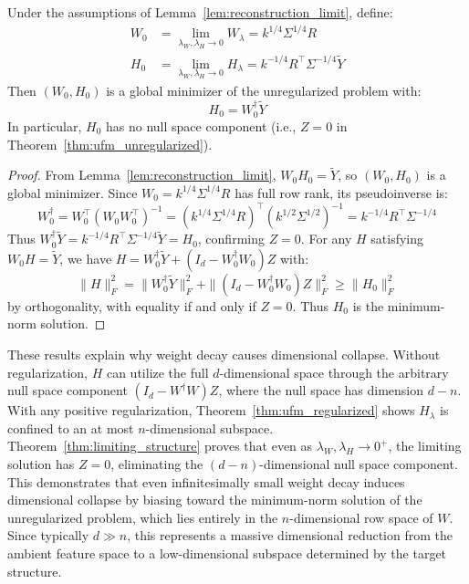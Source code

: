 \begin{theorem}
\label{thm:limiting_structure}
Under the assumptions of Lemma~\ref{lem:reconstruction_limit}, define:
\begin{align}
W_0 &= \lim_{\lambda_W, \lambda_H \to 0} W_\lambda = k^{1/4} \Sigma^{1/4} R\\
H_0 &= \lim_{\lambda_W, \lambda_H \to 0} H_\lambda = k^{-1/4} R^\top \Sigma^{-1/4} \tilde{Y}
\end{align}
Then $(W_0, H_0)$ is a global minimizer of the unregularized problem with:
\begin{equation}
H_0 = W_0^\dagger \tilde{Y}
\end{equation}
In particular, $H_0$ has no null space component (i.e., $Z = 0$ in Theorem~\ref{thm:ufm_unregularized}).
\end{theorem}

\begin{proof}
From Lemma~\ref{lem:reconstruction_limit}, $W_0 H_0 = \tilde{Y}$, so $(W_0, H_0)$ is a global minimizer. Since $W_0 = k^{1/4}\Sigma^{1/4}R$ has full row rank, its pseudoinverse is:
\begin{equation}
W_0^\dagger = W_0^\top (W_0 W_0^\top)^{-1} = (k^{1/4}\Sigma^{1/4}R)^\top (k^{1/2}\Sigma^{1/2})^{-1} = k^{-1/4}R^\top \Sigma^{-1/4}
\end{equation}
Thus $W_0^\dagger \tilde{Y} = k^{-1/4} R^\top \Sigma^{-1/4} \tilde{Y} = H_0$, confirming $Z = 0$. For any $H$ satisfying $W_0 H = \tilde{Y}$, we have $H = W_0^\dagger \tilde{Y} + (I_d - W_0^\dagger W_0)Z$ with:
\begin{equation}
\|H\|_F^2 = \|W_0^\dagger \tilde{Y}\|_F^2 + \|(I_d - W_0^\dagger W_0)Z\|_F^2 \geq \|H_0\|_F^2
\end{equation}
by orthogonality, with equality if and only if $Z = 0$. Thus $H_0$ is the minimum-norm solution.
\end{proof}

These results explain why weight decay causes dimensional collapse. Without regularization, $H$ can utilize the full $d$-dimensional space through the arbitrary null space component $(I_d - W^\dagger W)Z$, where the null space has dimension $d - n$. With any positive regularization, Theorem~\ref{thm:ufm_regularized} shows $H_\lambda$ is confined to an at most $n$-dimensional subspace. Theorem~\ref{thm:limiting_structure} proves that even as $\lambda_W, \lambda_H \to 0^+$, the limiting solution has $Z = 0$, eliminating the $(d-n)$-dimensional null space component. This demonstrates that even infinitesimally small weight decay induces dimensional collapse by biasing toward the minimum-norm solution of the unregularized problem, which lies entirely in the $n$-dimensional row space of $W$. Since typically $d \gg n$, this represents a massive dimensional reduction from the ambient feature space to a low-dimensional subspace determined by the target structure.


